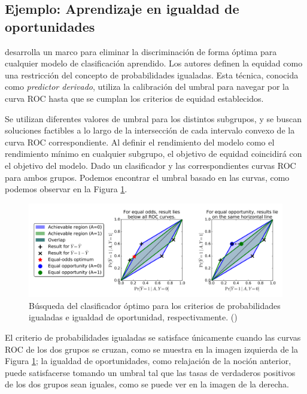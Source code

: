 \documentclass[oneside,openright,titlepage,numbers=noenddot,openany,headinclude,footinclude=true,
cleardoublepage=empty,abstractoff,BCOR=5mm,paper=a4,fontsize=12pt,main=spanish]{scrreprt}
\begin{document}
\subsection{Ejemplo: Aprendizaje en igualdad de oportunidades}

\cite{eodd2016} desarrolla un marco para eliminar la discriminación de forma óptima para cualquier modelo de clasificación aprendido. Los autores definen la equidad como una restricción del concepto de probabilidades igualadas. Esta técnica, conocida como \textit{predictor derivado}, utiliza la calibración del umbral para navegar por la curva ROC hasta que se cumplan los criterios de equidad establecidos. 

Se utilizan diferentes valores de umbral para los distintos subgrupos, y se buscan soluciones factibles a lo largo de la intersección de cada intervalo convexo de la curva ROC correspondiente. Al definir el rendimiento del modelo como el rendimiento mínimo en cualquier subgrupo, el objetivo de equidad coincidirá con el objetivo del modelo. Dado un clasificador y las correspondientes curvas ROC para ambos grupos. Podemos encontrar el umbral basado en las curvas, como podemos observar en la Figura \ref{fig:posprocessing}.

\clearpage

\begin{figure}[h]
	\centering
	\includegraphics[width=15.0cm]{posexample.png}
	\caption{Búsqueda del clasificador óptimo para los criterios de probabilidades igualadas e igualdad de oportunidad, respectivamente. (\cite{eodd2016})}
    \label{fig:posprocessing}
\end{figure}

El criterio de probabilidades igualadas se satisface únicamente cuando las curvas ROC de los dos grupos se cruzan, como se muestra en la imagen izquierda de la Figura \ref{fig:posprocessing}; la igualdad de oportunidades, como relajación de la noción anterior, puede satisfacerse tomando un umbral tal que las tasas de verdaderos positivos de los dos grupos sean iguales, como se puede ver en la imagen de la derecha.
\end{document}
